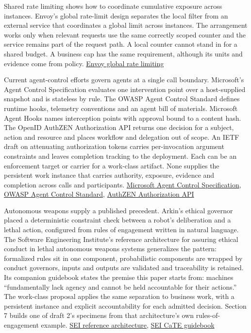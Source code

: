\documentclass[
  american,
  11pt,
  letterpaper,
]{article}
\begin{document}
Shared rate limiting shows how to coordinate cumulative exposure across
instances. Envoy's global rate-limit design separates the local filter
from an external service that coordinates a global limit across
instances. The arrangement works only when relevant requests use the
same correctly scoped counter and the service remains part of the
request path. A local counter cannot stand in for a shared budget. A
business cap has the same requirement, although its units and evidence
come from policy.
\href{https://www.envoyproxy.io/docs/envoy/latest/intro/arch_overview/other_features/global_rate_limiting.html}{Envoy
global rate limiting}

Current agent-control efforts govern agents at a single call boundary.
Microsoft's Agent Control Specification evaluates one intervention point
over a host-supplied snapshot and is stateless by rule. The OWASP Agent
Control Standard defines runtime hooks, telemetry conventions and an
agent bill of materials. Microsoft Agent Hooks names interception points
with approval bound to a content hash. The OpenID AuthZEN Authorization
API returns one decision for a subject, action and resource and places
workflow and delegation out of scope. An IETF draft on attenuating
authorization tokens carries per-invocation argument constraints and
leaves completion tracking to the deployment. Each can be an enforcement
target or carrier for a work-class artifact. None supplies the
persistent work instance that carries authority, exposure, evidence and
completion across calls and participants.
\href{https://github.com/microsoft/agent-governance-toolkit/blob/main/policy-engine/spec/SPECIFICATION.md}{Microsoft
Agent Control Specification},
\href{https://genai.owasp.org/resource/agent-control-standard-acs/}{OWASP
Agent Control Standard},
\href{https://openid.net/specs/authorization-api-1_0.html}{AuthZEN
Authorization API}

Autonomous weapons supply a published precedent. Arkin's ethical
governor placed a deterministic constraint check between a robot's
deliberation and a lethal action, configured from rules of engagement
written in natural language. The Software Engineering Institute's
reference architecture for assuring ethical conduct in lethal autonomous
weapons systems generalizes the pattern: formalized rules sit in one
component, probabilistic components are wrapped by conduct governors,
inputs and outputs are validated and traceability is retained. Its
companion guidebook states the premise this paper starts from: machines
``fundamentally lack agency and cannot be held accountable for their
actions.'' The work-class proposal applies the same separation to
business work, with a persistent instance and explicit accountability
for each admitted decision. Section 7 builds one of draft 2's specimens
from that architecture's own rules-of-engagement example.
\href{https://www.sei.cmu.edu/documents/6203/CaTE_LAWS_Reference_Architecture.pdf}{SEI
reference architecture},
\href{https://www.sei.cmu.edu/documents/6204/CaTE_Guidebook.pdf}{SEI
CaTE guidebook}
\end{document}
